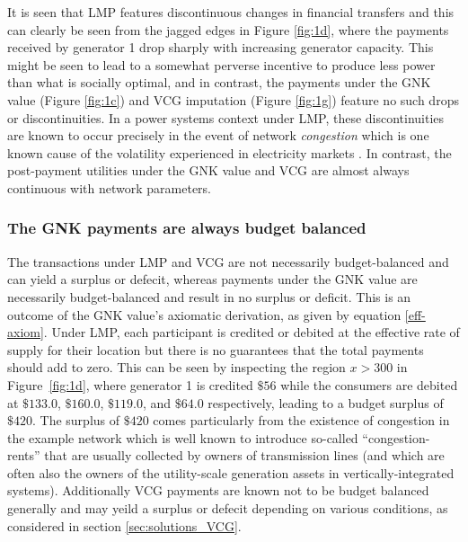 It is seen that LMP features discontinuous changes in financial transfers and this can clearly be seen from the jagged edges in Figure \ref{fig:1d}, where the payments received by generator 1 drop sharply with increasing generator capacity.
This might be seen to lead to a somewhat perverse incentive to produce less power than what is socially optimal, and in contrast, the payments under the GNK value (Figure \ref{fig:1c}) and VCG imputation (Figure \ref{fig:1g}) feature no such drops or discontinuities.
In a power systems context under LMP, these discontinuities are known to occur precisely in the event of network \emph{congestion}
which is one known cause of the volatility experienced in electricity markets \cite{RePEc:aen:journl:2006v27-02-a09}. 
In contrast, the post-payment utilities under the GNK value and VCG are almost always continuous with network parameters.



\subsubsection*{The GNK payments are always budget balanced}
The transactions under LMP and VCG are not necessarily budget-balanced and can yield a surplus or defecit, whereas payments under the GNK value are necessarily budget-balanced and result in no surplus or deficit.
This is an outcome of the GNK value's axiomatic derivation, as given by equation \eqref{eff-axiom}.
Under LMP, each participant is credited or debited at the effective rate of supply for their location but there is no guarantees that the total payments should add to zero.
This can be seen by inspecting the region $x>300$ in Figure~\ref{fig:1d}, where generator 1 is credited $\$56$ while the consumers are debited at $\$133.0$, $\$160.0$, $\$119.0$, and $\$64.0$ respectively, leading to a budget surplus of $\$420$.
The surplus of $\$420$ comes particularly from the existence of congestion in the example network which is well known to introduce so-called ``congestion-rents'' that are usually collected by owners of transmission lines \cite{lmp2} (and which are often also the owners of the utility-scale generation assets in vertically-integrated systems).
Additionally VCG payments are known not to be budget balanced generally and may yeild a surplus or defecit depending on various conditions, as considered in section \ref{sec:solutions_VCG}.

